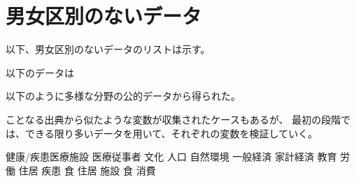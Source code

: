\newpage

\section{男女区別のないデータ}





以下、男女区別のないデータのリストは示す。

以下のデータは


以下のように多様な分野の公的データから得られた。

ことなる出典から似たような変数が収集されたケースもあるが、
最初の段階では、できる限り多いデータを用いて、それぞれの変数を検証していく。



健康/疾患医療施設
医療従事者
文化
人口
自然環境
一般経済
家計経済
教育
労働
住居
疾患
食
住居
施設
食
消費









